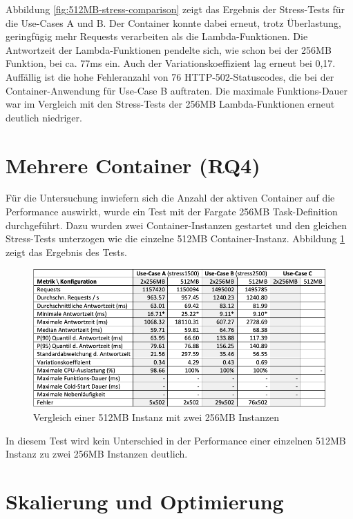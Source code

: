 Abbildung \ref{fig:512MB-stress-comparison} zeigt das Ergebnis der Stress-Tests für die Use-Cases A und B. Der Container konnte dabei erneut, trotz Überlastung, geringfügig mehr Requests verarbeiten als die Lambda-Funktionen. Die Antwortzeit der Lambda-Funktionen pendelte sich, wie schon bei der 256MB Funktion, bei ca. 77ms ein. Auch der Variationskoeffizient lag erneut bei 0,17. Auffällig ist die hohe Fehleranzahl von 76 HTTP-502-Statuscodes, die bei der Container-Anwendung für Use-Case B auftraten. Die maximale Funktions-Dauer war im Vergleich mit den Stress-Tests der 256MB Lambda-Funktionen erneut deutlich niedriger.

\section{Mehrere Container (RQ4)}
Für die Untersuchung inwiefern sich die Anzahl der aktiven Container auf die Performance auswirkt, wurde ein Test mit der Fargate 256MB Task-Definition durchgeführt. Dazu wurden zwei Container-Instanzen gestartet und den gleichen Stress-Tests unterzogen wie die einzelne 512MB Container-Instanz. Abbildung \ref{fig:fargate-512-vs-2x256-stress-comparison} zeigt das Ergebnis des Tests.

\begin{figure}[H]
    \includegraphics[width=\textwidth]{img/fargate-512-vs-2x256-stress-comparison.png}
    \caption[Vergleich einer 512MB Instanz mit zwei 256MB Instanzen]{Vergleich einer 512MB Instanz mit zwei 256MB Instanzen}
    \label{fig:fargate-512-vs-2x256-stress-comparison}
\end{figure}

In diesem Test wird kein Unterschied in der Performance einer einzelnen 512MB Instanz zu zwei 256MB Instanzen deutlich.

\section{Skalierung und Optimierung}
